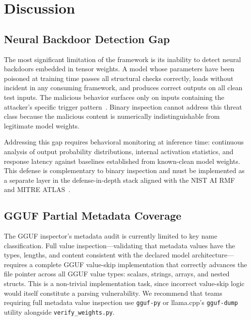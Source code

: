 \documentclass[preprint,12pt,twocolumn]{elsarticle}
\begin{document}
\section{Discussion}
\label{sec:discussion}

\subsection{Neural Backdoor Detection Gap}

The most significant limitation of the framework is its inability to detect
neural backdoors embedded in tensor weights. A model whose parameters have
been poisoned at training time passes all structural checks correctly, loads
without incident in any consuming framework, and produces correct outputs
on all clean test inputs. The malicious behavior surfaces only on inputs
containing the attacker's specific trigger pattern~\citep{gu2019badnets}.
Binary inspection cannot address this threat class because the malicious
content is numerically indistinguishable from legitimate model weights.

Addressing this gap requires behavioral monitoring at inference time:
continuous analysis of output probability distributions, internal activation
statistics, and response latency against baselines established from
known-clean model weights. This defense is complementary to binary
inspection and must be implemented as a separate layer in the
defense-in-depth stack aligned with the NIST AI RMF~\citep{nist_ai_rmf2023}
and MITRE ATLAS~\citep{mitre_atlas2023}.

\subsection{GGUF Partial Metadata Coverage}

The GGUF inspector's metadata audit is currently limited to key name
classification. Full value inspection---validating that metadata values
have the types, lengths, and content consistent with the declared model
architecture---requires a complete GGUF value-skip implementation that
correctly advances the file pointer across all GGUF value types: scalars,
strings, arrays, and nested structs. This is a non-trivial implementation
task, since incorrect value-skip logic would itself constitute a parsing
vulnerability. We recommend that teams requiring full metadata value
inspection use \texttt{gguf-py} or llama.cpp's \texttt{gguf-dump} utility
alongside \texttt{verify\_weights.py}.
\end{document}
